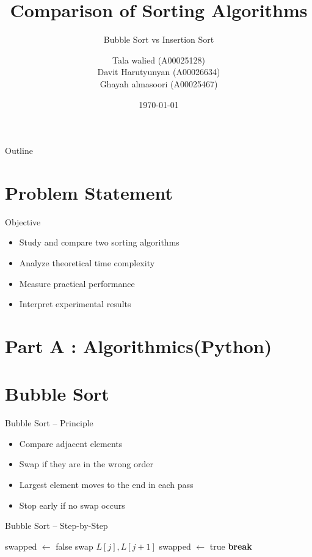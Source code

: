 \documentclass[aspectratio=169]{beamer}
\title{Comparison of Sorting Algorithms}
\subtitle{Bubble Sort vs Insertion Sort}
\author{Tala walied (A00025128) \\ Davit Harutyunyan (A00026634) \\ Ghayah almasoori (A00025467)}
\institute{Sorbonne University Abu Dhabi}
\date{\today}
\begin{document}
\begin{frame}
\titlepage
\end{frame}

\begin{frame}{Outline}
\tableofcontents
\end{frame}

\section{Problem Statement}

\begin{frame}{Objective}
\begin{itemize}
    \item<1->Study and compare two sorting algorithms
    \item<2-> Analyze theoretical time complexity
    \item<3-> Measure practical performance
    \item<4-> Interpret experimental results
\end{itemize}
\end{frame}

\section{Part A : Algorithmics(Python)}
\section{Bubble Sort}

\begin{frame}{Bubble Sort – Principle}
\begin{itemize}
    \item<1-> Compare adjacent elements
    \item<2-> Swap if they are in the wrong order
    \item<3-> Largest element moves to the end in each pass
    \item<4-> Stop early if no swap occurs
\end{itemize}
\end{frame}


\begin{frame}{Bubble Sort – Step-by-Step}
\setcounter{algorithm}{0}
\begin{algorithm}[H]
\caption{Bubble Sort}
\begin{algorithmic}[1]
 \pause
    \State swapped $\gets$ false \pause
     \pause
         \pause
            \State swap $L[j], L[j+1]$ \pause
            \State swapped $\gets$ true \pause
        \EndIf
    \EndFor \pause
     \pause
        \State \textbf{break}
    \EndIf
\EndFor
\end{algorithmic}
\end{algorithm}
\end{frame}
\end{document}
